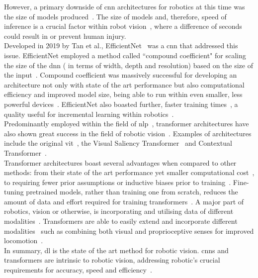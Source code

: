 \documentclass[11pt]{article}
\begin{document}
However, a primary downside of \acrshort{cnn} architectures for robotics at this time was the size of models produced~\cite{Trends_in_deep_convolutional_neural_Networks}. The size of models and, therefore, speed of inference is a crucial factor within robot vision~\cite{future_trends_on_robot_vision_technology}, where a difference of seconds could result in or prevent human injury.\\
Developed in 2019 by Tan et al., EfficientNet~\cite{OG_EfficientNet} was a \acrshort{cnn} that addressed this issue. EfficientNet employed a method called ``compound coefficient" for scaling the size of the \acrshort{dnn} ( in terms of width, depth and resolution) based on the size of the input~\cite{OG_EfficientNet}. Compound coefficient was massively successful for developing an architecture not only with state of the art performance but also computational efficiency and improved model size, being able to run within even smaller, less powerful devices~\cite{An_evaluation_of_EfficientDet, L-EfficientUNet:_Lightweight_End-to-End}. EfficientNet also boasted further, faster training times~\cite{Efficientnetv2}, a quality useful for incremental learning within robotics~\cite{limits_and_potentials_of_deep_learning_for_robotics}.\\
Predominantly employed within the field of \acrshort{nlp}~\cite{A_survey_of_visual_Transformers, Transformers_in_vision:_A_survey}, transformer architectures have also shown great success in the field of robotic vision~\cite{Real-world_robot_learning_with_masked_visual_pre-training}. Examples of architectures include the original \acrfull{vit}~\cite{OG_vit}, the Visual Saliency Transformer~\cite{Visual_saliency_Transformer} and Contextual Transformer~\cite{contextual_Transformer}.\\
Transformer architectures boast several advantages when compared to other methods: from their state of the art performance yet smaller computational cost~\cite{OG_vit}, to requiring fewer prior assumptions or inductive biases prior to training~\cite{Transformers_in_vision:_A_survey}. Fine-tuning pretrained models, rather than training one from scratch, reduces the amount of data and effort required for training transformers~\cite{Monocular_Robot_Navigation...}. A major part of robotics, vision or otherwise, is incorporating and utilising data of different modalities~\cite{Learning_Unseen_Modality_Interaction}. Transformers are able to easily extend and incorporate different modalities~\cite{Transformers_in_vision:_A_survey} such as combining both visual and proprioceptive senses for improved locomotion~\cite{Learning_Vision_Guided_Quadrupedal_Locomotion...}.\\
In summary, \acrshort{dl} is the state of the art method for robotic vision. \acrshort{cnn}s and transformers are intrinsic to robotic vision, addressing robotic's crucial requirements for accuracy, speed and efficiency~\cite{limits_and_potentials_of_deep_learning_for_robotics, future_trends_on_robot_vision_technology}.
\end{document}
